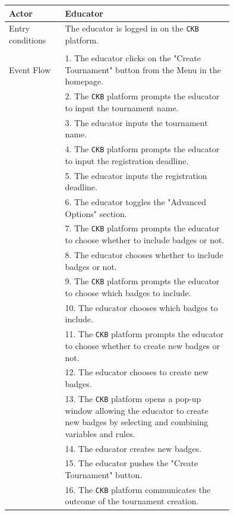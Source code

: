 \begin{center}
    \begin{longtable}{lp{0.75\linewidth}}
        \hline
        Actor            & Educator                                                                                                                                                                               \\
        \hline
        Entry conditions & The educator is logged in on the \verb|CKB| platform.\\                                                                                                               \\
        \hline
        Event Flow       
        & 1. The educator clicks on the "Create Tournament" button from the Menu in the homepage.\\
        & 2. The \verb|CKB| platform prompts the educator to input the tournament name.\\
        & 3. The educator inputs the tournament name.\\
        & 4. The \verb|CKB| platform prompts the educator to input the registration deadline.\\
        & 5. The educator inputs the registration deadline.\\
        & 6. The educator toggles the "Advanced Options" section.\\
        & 7. The \verb|CKB| platform prompts the educator to choose whether to include badges or not.\\
        & 8. The educator chooses whether to include badges or not.\\
        & 9. The \verb|CKB| platform prompts the educator to choose which badges to include.\\
        & 10. The educator chooses which badges to include.\\
        & 11. The \verb|CKB| platform prompts the educator to choose whether to create new badges or not.\\
        & 12. The educator chooses to create new badges.\\
        & 13. The \verb|CKB| platform opens a pop-up window allowing the educator to create new badges by selecting and combining variables and rules.\\
        & 14. The educator creates new badges.\\
        & 15. The educator pushes the "Create Tournament" button.\\
        & 16. The \verb|CKB| platform communicates the outcome of the tournament creation.\\

\end{longtable}
\end{center}
